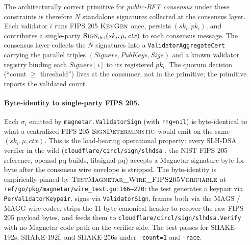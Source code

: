 The architecturally correct primitive for \emph{public-BFT consensus}
under these constraints is therefore $N$ standalone signatures
collected at the consensus layer. Each validator $i$ runs FIPS 205
$\textsc{KeyGen}$ once, persists $(sk_i, pk_i)$, and contributes a
single-party $\textsc{Sign}_{\mathrm{det}}(sk_i, \mu, \mathit{ctx})$
to each consensus message. The consensus layer collects the $N$
signatures into a \texttt{ValidatorAggregateCert} carrying the
parallel triples
$(\mathit{Signers}, \mathit{PubKeys}, \mathit{Sigs})$ and a known
validator registry binding each $\mathit{Signers}[i]$ to its
registered $pk_i$. The quorum decision (``count $\ge$ threshold'')
lives at the consumer, not in the primitive; the primitive reports
the validated count.

\paragraph{Byte-identity to single-party FIPS 205.} Each $\sigma_i$
emitted by \texttt{magnetar.ValidatorSign} (with \texttt{rng=nil}) is
byte-identical to what a centralized FIPS 205
$\textsc{SignDeterministic}$ would emit on the same
$(sk_i, \mu, \mathit{ctx})$. This is the load-bearing operational
property: every SLH-DSA verifier in the wild
(\texttt{cloudflare/circl/sign/slhdsa} \cite{circl}, the NIST FIPS
205 reference, openssl-pq builds, libsignal-pq) accepts a Magnetar
signature byte-for-byte after the consensus wire envelope is
stripped. The byte-identity is empirically pinned by
$\textsc{TestMagnetar\_Wire\_FIPS205Verifiable}$ at
\texttt{ref/go/pkg/magnetar/wire\_test.go:166--220}: the test
generates a keypair via \texttt{PerValidatorKeypair}, signs via
\texttt{ValidatorSign}, frames both via the MAGS / MAGG wire codec,
strips the 11-byte canonical header to recover the raw FIPS 205
payload bytes, and feeds them to
\texttt{cloudflare/circl/sign/slhdsa.Verify} with no Magnetar code
path on the verifier side. The test passes for SHAKE-192s,
SHAKE-192f, and SHAKE-256s under \texttt{-count=1} and \texttt{-race}.

